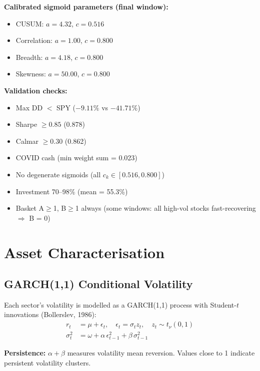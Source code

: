 \documentclass[11pt,a4paper]{article}
\begin{document}
\textbf{Calibrated sigmoid parameters (final window):}
\begin{itemize}[nosep]
  \item CUSUM: $a = 4.32$, $c = 0.516$
  \item Correlation: $a = 1.00$, $c = 0.800$
  \item Breadth: $a = 4.18$, $c = 0.800$
  \item Skewness: $a = 50.00$, $c = 0.800$
\end{itemize}

\textbf{Validation checks:}
\begin{itemize}[nosep]
  \item[\checkmark] Max DD $<$ SPY ($-9.11\%$ vs $-41.71\%$)
  \item[\checkmark] Sharpe $\ge 0.85$ (0.878)
  \item[\checkmark] Calmar $\ge 0.30$ (0.862)
  \item[\checkmark] COVID cash (min weight sum = 0.023)
  \item[\checkmark] No degenerate sigmoids (all $c_k \in [0.516, 0.800]$)
  \item[$\times$] Investment 70--98\% (mean = 55.3\%)
  \item[$\times$] Basket A$\ge$1, B$\ge$1 always (some windows: all high-vol stocks fast-recovering $\Rightarrow$ B = 0)
\end{itemize}

\section{Asset Characterisation}
\label{sec:characterisation}

\subsection{GARCH(1,1) Conditional Volatility}

Each sector's volatility is modelled as a GARCH(1,1) process with Student-$t$ innovations (Bollerslev, 1986):
\begin{align}
  r_t &= \mu + \epsilon_t, \quad \epsilon_t = \sigma_t z_t, \quad z_t \sim t_\nu(0,1) \\
  \sigma_t^2 &= \omega + \alpha\,\epsilon_{t-1}^2 + \beta\,\sigma_{t-1}^2
\end{align}

\textbf{Persistence:} $\alpha + \beta$ measures volatility mean reversion. Values close to 1 indicate persistent volatility clusters.
\end{document}
